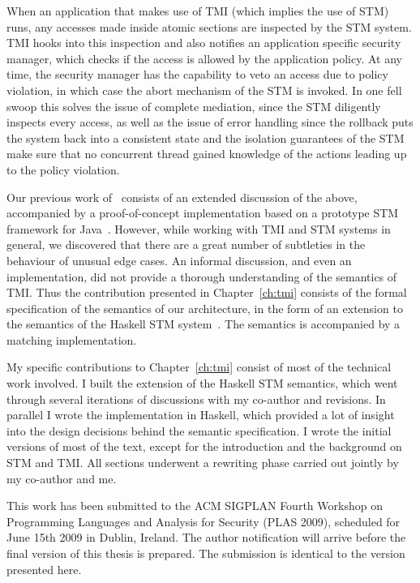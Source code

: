 When an application that makes use of TMI (which implies the use of STM) runs,
any accesses made inside atomic sections are inspected by the STM system. TMI
hooks into this inspection and also notifies an application specific security
manager, which checks if the access is allowed by the application policy. At any
time, the security manager has the capability to veto an access due to policy
violation, in which case the abort mechanism of the STM is invoked. In one fell
swoop this solves the issue of complete mediation, since the STM diligently
inspects every access, as well as the issue of error handling since the rollback
puts the system back into a consistent state and the isolation guarantees of the
STM make sure that no concurrent thread gained knowledge of the actions leading
up to the policy violation.

Our previous work of~\cite{tmi} consists of an extended discussion of the above,
accompanied by a proof-of-concept implementation based on a prototype STM framework
for Java~\cite{hlm06}. However, while working with TMI and STM systems in general,
we discovered that there are a great number of subtleties in the behaviour of
unusual edge cases. An informal discussion, and even an implementation, did not
provide a thorough understanding of the semantics of TMI. Thus the contribution
presented in Chapter~\ref{ch:tmi} consists of the formal specification of the semantics
of our architecture, in the form of an extension to the semantics of the Haskell
STM system~\cite{haskellstm}. The semantics is accompanied by a matching implementation.

My specific contributions to Chapter~\ref{ch:tmi} consist of most of the technical
work involved. I built the extension of the Haskell STM semantics, which went
through several iterations of discussions with my co-author and revisions. In
parallel I wrote the implementation in Haskell, which provided a lot of insight
into the design decisions behind the semantic specification. I wrote the initial
versions of most of the text, except for the introduction and the background on
STM and TMI. All sections underwent a rewriting phase carried out jointly by
my co-author and me.

This work has been submitted to the ACM SIGPLAN Fourth Workshop on Programming
Languages and Analysis for Security (PLAS 2009), scheduled for June 15th 2009
in Dublin, Ireland. The author notification will arrive before the final version
of this thesis is prepared. The submission is identical to the version presented
here.

